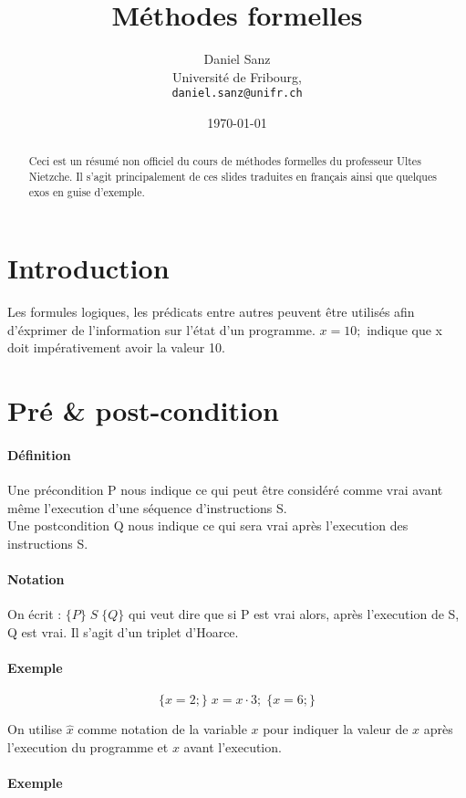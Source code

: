 \documentclass[12pt]{article}
\title{Méthodes formelles}
\author{Daniel Sanz\\
   Université de Fribourg,\\
   \texttt{daniel.sanz@unifr.ch}}
\date{\today}
\begin{document}
\maketitle

\begin{abstract}
    Ceci est un résumé non officiel du cours de méthodes 
    formelles du professeur Ultes Nietzche. Il s'agit
    principalement de ces slides traduites en français
    ainsi que quelques exos en guise d'exemple.
\end{abstract}

\section*{Introduction}
Les formules logiques, les prédicats entre autres peuvent être 
utilisés afin d'éxprimer de l'information sur l'état d'un programme.
\(x = 10;\) indique que x doit impérativement avoir la valeur
10.
\section*{Pré \& post-condition}
\paragraph*{Définition}
Une précondition P nous indique ce qui peut être considéré comme 
vrai avant même l'execution d'une séquence d'instructions S.\\
Une postcondition Q nous indique ce qui sera vrai après l'execution
des instructions S.
\paragraph*{Notation}
On écrit : \(\{P\}\; S\; \{Q\}\) qui veut dire que si P est vrai alors,
après l'execution de S, Q est vrai. Il s'agit d'un triplet d'Hoarce.\\

\paragraph*{Exemple}
\begin{equation*}
    \{x = 2;\}\; x = x \cdot 3;\; \{x = 6;\}
\end{equation*}

On utilise \(\hat{x}\) comme notation de la variable \(x\) pour indiquer
la valeur de \(x\) après l'execution du programme et \(x\) avant l'execution.\\
\paragraph*{Exemple}
\end{document}
